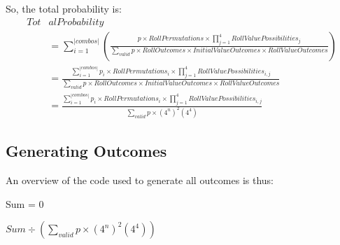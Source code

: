 \documentclass[12pt]{article}
\begin{document}
So, the total probability is:
\begin{align*}
	Tot&alProbability \\[8pt]
	&= \sum_{i = 1}^{|combos|}\left(\frac{p \times RollPermutations \times \prod_{j = 1}^{4} RollValuePossibilities_j}{\sum_{valid} p \times RollOutcomes \times InitialValueOutcomes \times RollValueOutcomes}\right) \\[12pt]
	&= \frac{\sum_{i = 1}^{|combos|} p_i \times RollPermutations_i \times \prod_{j = 1}^{4} RollValuePossibilities_{i,j}}{\sum_{valid} p \times RollOutcomes \times InitialValueOutcomes \times RollValueOutcomes} \\[12pt]
	&= \frac{\sum_{i = 1}^{|combos|} p_i \times RollPermutations_i \times \prod_{j = 1}^{4} RollValuePossibilities_{i,j}}{\sum_{valid} p \times (4^n)^2(4^4)}
\end{align*}

\subsection{Generating Outcomes}

An overview of the code used to generate all outcomes is thus:

\begin{algorithm}[H]
	\SetInd{0.4em}{0.4em}

	Sum = 0 \\
	
	
	\Return $Sum \div (\sum_{valid} p \times (4^n)^2(4^4))$
\end{algorithm}
\end{document}
